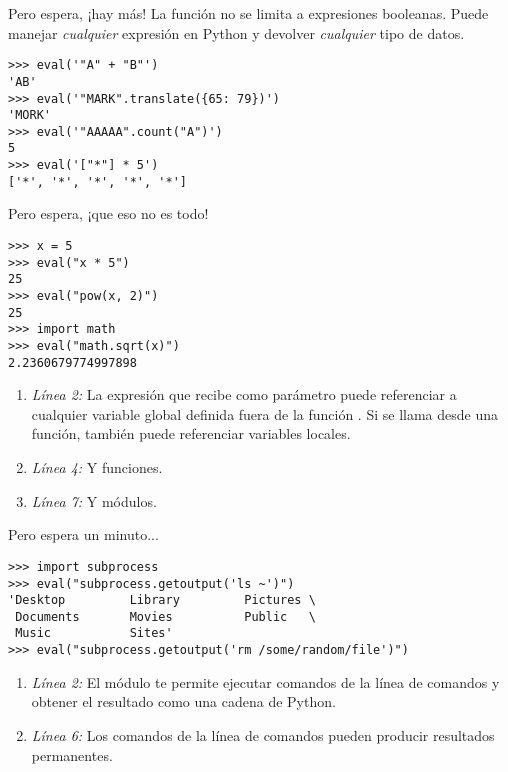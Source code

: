 Pero espera, ¡hay más! La función  no se limita a expresiones booleanas. Puede manejar \emph{cualquier} expresión en Python y devolver \emph{cualquier} tipo de datos.

\noindent\begin{minipage}{\textwidth}
\begin{lstlisting}[mathescape=True]
>>> eval('"A" + "B"')
'AB'
>>> eval('"MARK".translate({65: 79})')
'MORK'
>>> eval('"AAAAA".count("A")')
5
>>> eval('["*"] * 5')
['*', '*', '*', '*', '*']
\end{lstlisting}
\end{minipage}

Pero espera, ¡que eso no es todo!

\noindent\begin{minipage}{\textwidth}
\begin{lstlisting}[mathescape=True]
>>> x = 5
>>> eval("x * 5")
25
>>> eval("pow(x, 2)")
25
>>> import math
>>> eval("math.sqrt(x)")
2.2360679774997898
\end{lstlisting}
\end{minipage}

\begin{enumerate}

\item \emph{Línea 2:} La expresión que  recibe como parámetro puede referenciar a cualquier variable global definida fuera de la función . Si se llama desde una función, también puede referenciar variables locales.

\item \emph{Línea 4:} Y funciones.

\item \emph{Línea 7:} Y módulos.

\end{enumerate}

Pero espera un minuto...

\noindent\begin{minipage}{\textwidth}
\begin{lstlisting}[mathescape=True]
>>> import subprocess
>>> eval("subprocess.getoutput('ls ~')")
'Desktop         Library         Pictures \
 Documents       Movies          Public   \
 Music           Sites'
>>> eval("subprocess.getoutput('rm /some/random/file')")
\end{lstlisting}
\end{minipage}

\begin{enumerate}

\item \emph{Línea 2:} El módulo  te permite ejecutar comandos de la línea de comandos y obtener el resultado como una cadena de Python.

\item \emph{Línea 6:} Los comandos de la línea de comandos pueden producir resultados permanentes.

\end{enumerate}

